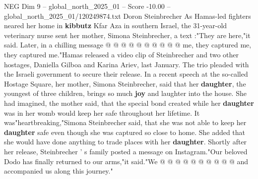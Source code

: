 \begin{textsample}{NEG Dim 9 – global\_north\_2025\_01 – Score -10.00 – global\_north\_2025\_01/120249874.txt}
Doron Steinbrecher As Hamas-led fighters neared her home in \textbf{kibbutz} Kfar Aza in southern Israel, the 31-year-old veterinary nurse sent her mother, Simona Steinbrecher, a text :"They are here,"it said.
Later, in a chilling message @ @ @ @ @ @ @ @ @ @ me, they captured me, they captured me."Hamas released a video clip of Steinbrecher and two other hostages, Daniella Gilboa and Karina Ariev, last January.
The trio pleaded with the Israeli government to secure their release.
In a recent speech at the so-called Hostage Square, her mother, Simona Steinbrecher, said that her \textbf{daughter}, the youngest of three children, brings so much \textbf{joy} and laughter into the house.
She had imagined, the mother said, that the special bond created while her \textbf{daughter} was in her womb would keep her safe throughout her lifetime.
It was"heartbreaking,"Simona Steinbrecher said, that she was not able to keep her \textbf{daughter} safe even though she was captured so close to home.
She added that she would have done anything to trade places with her \textbf{daughter}.
Shortly after her release, Steinbrecher ' s family posted a message on Instagram."Our beloved Dodo has finally returned to our arms,"it said."We @ @ @ @ @ @ @ @ @ @ and accompanied us along this journey."

\end{textsample}

